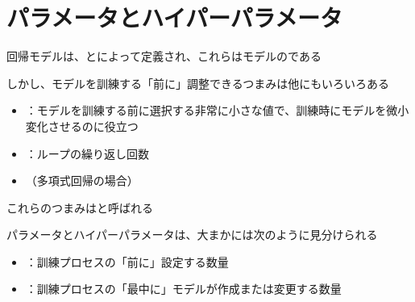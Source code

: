 \documentclass[../../../topic_machine-learning]{subfiles}
\begin{document}
\sectionline
\section{パラメータとハイパーパラメータ}

回帰モデルは、とによって定義され、これらはモデルのである

\br

しかし、モデルを訓練する「前に」調整できるつまみは他にもいろいろある

\begin{itemize}
  \item {}：モデルを訓練する前に選択する非常に小さな値で、訓練時にモデルを微小変化させるのに役立つ
  \item {}：ループの繰り返し回数
  \item {}（多項式回帰の場合）
\end{itemize}

これらのつまみはと呼ばれる

\br

パラメータとハイパーパラメータは、大まかには次のように見分けられる

\begin{itemize}
  \item {}：訓練プロセスの「前に」設定する数量
  \item {}：訓練プロセスの「最中に」モデルが作成または変更する数量
\end{itemize}
\end{document}
